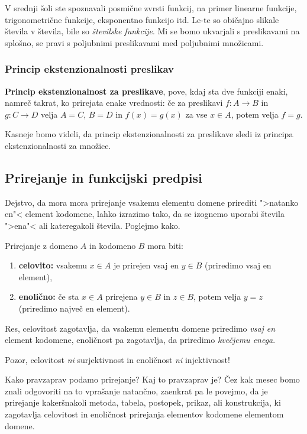 V srednji šoli ste spoznavali posmične zvrsti funkcij, na primer linearne funkcije, trigonometrične funkcije, eksponentno funkcijo itd. Le-te so običajno slikale števila v števila, bile so \emph{številske funkcije}. Mi se bomo ukvarjali s preslikavami na splošno, se pravi s poljubnimi preslikavami med poljubnimi množicami.

\subsubsection{Princip ekstenzionalnosti preslikav}

\textbf{Princip ekstenzionalnost za preslikave}, pove, kdaj sta dve funkciji enaki, namreč takrat, ko prirejata enake vrednosti:  če za preslikavi $f : A \to B$ in $g : C \to D$ velja $A = C$, $B = D$ in $f(x) = g(x)$ za vse $x \in A$, potem velja $f = g$.

Kasneje bomo videli, da princip ekstenzionalnosti za preslikave sledi iz principa ekstenzionalnosti za množice.

\subsection{Prirejanje in funkcijski predpisi}

Dejstvo, da mora mora prirejanje vsakemu elementu domene prirediti ">natanko en"< element kodomene, lahko izrazimo tako, da se izognemo uporabi števila ">ena"< ali kateregakoli števila. Poglejmo kako.

Prirejanje z domeno $A$ in kodomeno $B$ mora biti:
%
\begin{enumerate}
\item \textbf{celovito:} vsakemu $x \in A$ je prirejen vsaj en $y \in B$ (priredimo vsaj en element),
\item \textbf{enolično:} če sta $x \in A$ prirejena $y \in B$ in $z \in B$, potem velja $y = z$ (priredimo največ en element).
\end{enumerate}
%
Res, celovitost zagotavlja, da vsakemu elementu domene priredimo \emph{vsaj en} element kodomene, enoličnost pa zagotavlja, da priredimo \emph{kvečjemu enega}.

\begin{opomba}
  Pozor, celovitost \emph{ni} surjektivnost in enoličnost \emph{ni} injektivnost!
\end{opomba}

Kako pravzaprav podamo prirejanje? Kaj to pravzaprav je? Čez kak mesec bomo znali odgovoriti na to vprašanje natančno, zaenkrat pa le povejmo, da je prirejanje kakeršnakoli metoda, tabela, postopek, prikaz, ali konstrukcija, ki zagotavlja celovitost in enoličnost prirejanja elementov kodomene elementom domene.

